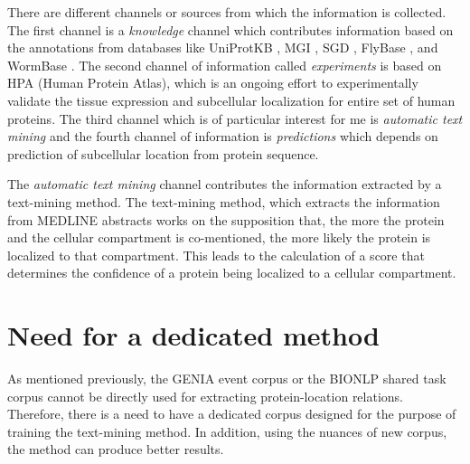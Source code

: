 There are different channels or sources from which the information is collected. The first channel is a \textit{knowledge} channel which contributes information based on the annotations from databases like UniProtKB \cite{magrane2011uniprot}, MGI \cite{bult2008mouse}, SGD \cite{cherry2011saccharomyces}, FlyBase \cite{mcquilton2011flybase}, and WormBase \cite{harris2010wormbase}. The second channel of information called \textit{experiments} is based on HPA (Human Protein Atlas), which is an ongoing effort to experimentally validate  the tissue expression and subcellular localization for entire set of human proteins. The third channel which is of particular interest for me is \textit{automatic text mining} and the fourth channel of information is \textit{predictions} which depends on prediction of subcellular location from protein sequence.

The \textit{automatic text mining} channel contributes the information extracted by a text-mining method. The text-mining method, which extracts the information from MEDLINE abstracts works on the supposition that, the more the protein and the cellular compartment is co-mentioned, the more likely the protein is localized to that compartment. This leads to the calculation of a score that determines the confidence of a protein being localized to a cellular compartment.

\section{Need for a dedicated method}
%

As mentioned previously, the GENIA event corpus or the BIONLP shared task corpus cannot be directly used for extracting protein-location relations. Therefore, there is a need to have a dedicated corpus designed for the purpose of training the text-mining method. In addition, using the nuances of new corpus, the method can produce better results.


